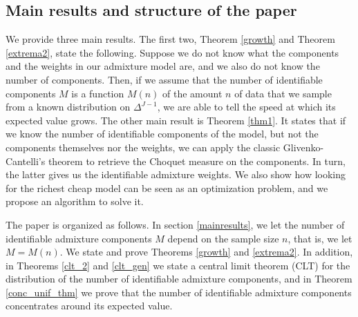 \documentclass[12pt, reqno]{amsart}
\theoremstyle{definition}
\begin{document}

\subsection{Main results and structure of the paper}
We provide three main results. The first two, Theorem \ref{growth} and Theorem \ref{extrema2}, state the following. Suppose we do not know what the components and the weights in our admixture model are, and we also do not know the number of components. Then, if we assume that the number of identifiable components $M$ is a function $M(n)$ of the amount $n$ of data that we sample from a known distribution on $\Delta^{J-1}$, we are able to tell the speed at which its expected value grows. The other main result is Theorem \ref{thm1}. It states that if we know the number of identifiable components of the model, but not the components themselves nor the weights, we can apply the classic Glivenko-Cantelli's theorem to retrieve the Choquet measure on the components. In turn, the latter gives us the identifiable admixture weights. 
We also show how looking for the richest cheap model can be seen as an optimization problem, and we propose an algorithm to solve it. 

The paper is organized as follows. In section \ref{mainresults}, we let the number of identifiable admixture components $M$ depend on the sample size $n$, that is, we let $M=M(n)$. 
We state and prove Theorems \ref{growth} and \ref{extrema2}. In addition, in Theorems \ref{clt_2} and \ref{clt_gen} we state a central limit theorem (CLT) for the distribution of the number of identifiable admixture components, and in Theorem \ref{conc_unif_thm} we prove that the number of identifiable admixture components concentrates around its expected value. 
\end{document}
